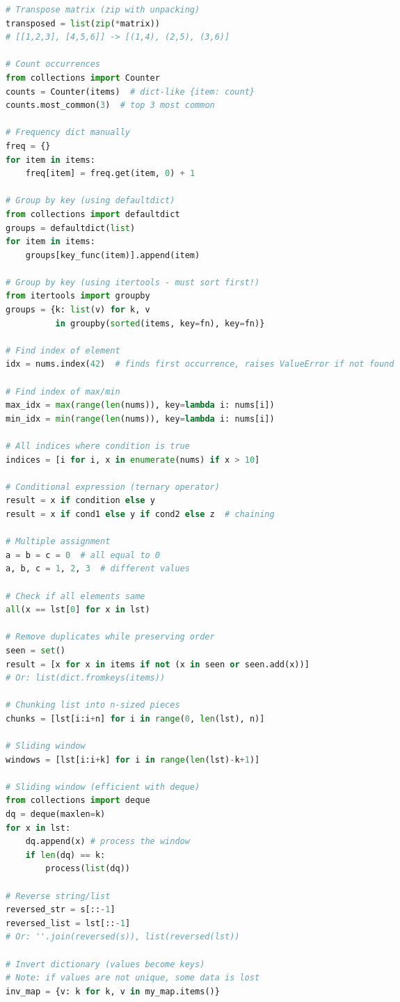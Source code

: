 \documentclass[8pt,landscape]{article}
\begin{document}
\begin{multicols}{3}
\begin{lstlisting}[language=Python]
# Transpose matrix (zip with unpacking)
transposed = list(zip(*matrix))
# [[1,2,3], [4,5,6]] -> [(1,4), (2,5), (3,6)]

# Count occurrences
from collections import Counter
counts = Counter(items)  # dict-like {item: count}
counts.most_common(3)  # top 3 most common

# Frequency dict manually
freq = {}
for item in items:
    freq[item] = freq.get(item, 0) + 1

# Group by key (using defaultdict)
from collections import defaultdict
groups = defaultdict(list)
for item in items:
    groups[key_func(item)].append(item)

# Group by key (using itertools - must sort first!)
from itertools import groupby
groups = {k: list(v) for k, v
          in groupby(sorted(items, key=fn), key=fn)}

# Find index of element
idx = nums.index(42)  # finds first occurrence, raises ValueError if not found

# Find index of max/min
max_idx = max(range(len(nums)), key=lambda i: nums[i])
min_idx = min(range(len(nums)), key=lambda i: nums[i])

# All indices where condition is true
indices = [i for i, x in enumerate(nums) if x > 10]

# Conditional expression (ternary operator)
result = x if condition else y
result = x if cond1 else y if cond2 else z  # chaining

# Multiple assignment
a = b = c = 0  # all equal to 0
a, b, c = 1, 2, 3  # different values

# Check if all elements same
all(x == lst[0] for x in lst)

# Remove duplicates while preserving order
seen = set()
result = [x for x in items if not (x in seen or seen.add(x))]
# Or: list(dict.fromkeys(items))

# Chunking list into n-sized pieces
chunks = [lst[i:i+n] for i in range(0, len(lst), n)]

# Sliding window
windows = [lst[i:i+k] for i in range(len(lst)-k+1)]

# Sliding window (efficient with deque)
from collections import deque
dq = deque(maxlen=k)
for x in lst:
    dq.append(x) # process the window
    if len(dq) == k:
        process(list(dq)) 

# Reverse string/list
reversed_str = s[::-1]
reversed_list = lst[::-1]
# Or: ''.join(reversed(s)), list(reversed(lst))

# Invert dictionary (values become keys)
# Note: if values are not unique, some data is lost
inv_map = {v: k for k, v in my_map.items()}


\end{lstlisting}
\end{multicols}
\end{document}
